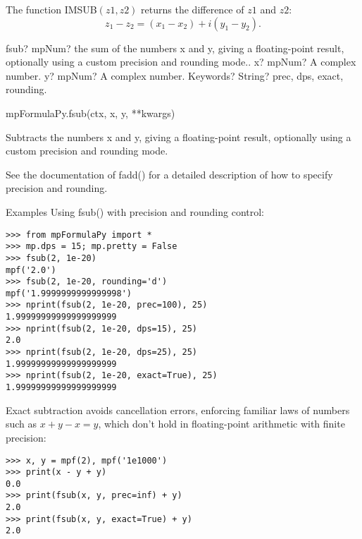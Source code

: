 \vspace{0.3cm}
The function \textsf{IMSUB$(z1, z2)$} returns the difference of $z1$ and $z2$: 
\begin{equation}
	z_1 - z_2 =(x_1 - x_2) + i(y_1 - y_2).
\end{equation}




\vspace{0.3cm}
\begin{mpFunctionsExtract}
	\mpFunctionThree
	{fsub? mpNum? the sum of the numbers x and y, giving a floating-point result, optionally using a custom precision and rounding mode..}
	{x? mpNum? A complex number.}
	{y? mpNum? A complex number.}
	{Keywords? String? prec, dps, exact, rounding.}	
\end{mpFunctionsExtract}

\vspace{0.3cm}
mpFormulaPy.fsub(ctx, x, y, **kwargs)

\vpara
Subtracts the numbers x and y, giving a floating-point result, optionally using a custom precision and rounding mode.

\vpara
See the documentation of fadd() for a detailed description of how to specify precision and rounding.

\vpara
Examples
Using fsub() with precision and rounding control:

\begin{lstlisting}
>>> from mpFormulaPy import *
>>> mp.dps = 15; mp.pretty = False
>>> fsub(2, 1e-20)
mpf('2.0')
>>> fsub(2, 1e-20, rounding='d')
mpf('1.9999999999999998')
>>> nprint(fsub(2, 1e-20, prec=100), 25)
1.99999999999999999999
>>> nprint(fsub(2, 1e-20, dps=15), 25)
2.0
>>> nprint(fsub(2, 1e-20, dps=25), 25)
1.99999999999999999999
>>> nprint(fsub(2, 1e-20, exact=True), 25)
1.99999999999999999999
\end{lstlisting}


Exact subtraction avoids cancellation errors, enforcing familiar laws of numbers such as $x+y-x=y$, which don’t hold in floating-point arithmetic with finite precision:

\begin{lstlisting}
>>> x, y = mpf(2), mpf('1e1000')
>>> print(x - y + y)
0.0
>>> print(fsub(x, y, prec=inf) + y)
2.0
>>> print(fsub(x, y, exact=True) + y)
2.0
\end{lstlisting}


